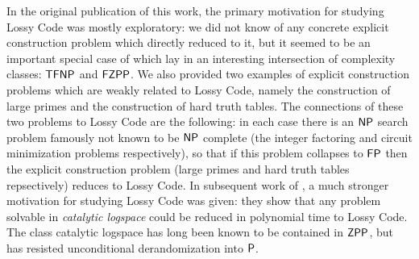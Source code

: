 In the original publication of this work, the primary motivation for studying {\sc Lossy Code} was mostly exploratory: we did not know of any concrete explicit construction problem which directly reduced to it, but it seemed to be an important special case of \avoid which lay in an interesting intersection of complexity classes: $\cl{TFNP}$ and $\cl{FZPP}$. We also provided two examples of explicit construction problems which are weakly related to {\sc Lossy Code}, namely the construction of large primes and the construction of hard truth tables. The connections of these two problems to {\sc Lossy Code} are the following: in each case there is an $\cl{NP}$ search problem famously not known to be $\cl{NP}$ complete (the integer factoring and circuit minimization problems respectively), so that if this problem collapses to $\cl{FP}$ then the explicit construction problem (large primes and hard truth tables repsectively) reduces to {\sc Lossy Code}. In subsequent work of \cite{lossy-cl}, a much stronger motivation for studying {\sc Lossy Code} was given: they show that any problem solvable in \emph{catalytic logspace} could be reduced in polynomial time to {\sc Lossy Code}. The class catalytic logspace has long been known to be contained in $\cl{ZPP}$, but has resisted unconditional derandomization into $\cl{P}$. 

